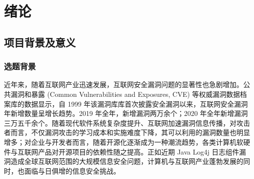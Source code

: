 \documentclass[a4paper,AutoFakeBold,oneside,12pt]{book}
\begin{document}
\blankmatter


\blankmatter


\blankmatter


\blankmatter


\frontmatter\tableofcontents %


\newpage\mainmatter
{}

\sloppy

\chapter{绪论}

\section{项目背景及意义}

\subsection{选题背景}

近年来，随着互联网产业迅速发展，互联网安全漏洞问题的显著性也急剧增加。公共漏洞和暴露 (Common Vulnerabilities and Exposures, CVE) 等权威漏洞数据档案库的数据显示\cite{download_cve_list}\cite{nvd_cpe_statistics}，自 1999 年该漏洞库库首次披露安全漏洞以来，互联网安全漏洞年新增数量呈增长趋势。2019 年全年，新增漏洞两万余个；2020 年全年新增漏洞三万五千余个。随着现代软件系统复杂度提升、互联网加速漏洞信息传播，对攻击者而言，不仅漏洞攻击的学习成本和实施难度下降，其可以利用的漏洞数量也明显增多\cite{vuldb_stats}；对企业与开发者而言，随着开源化逐渐成为一种潮流趋势，各类计算机软硬件与互联网产品对开源项目的依赖性随之提高。正如近期 Java Log4j 日志组件漏洞造成全球互联网范围的大规模信息安全问题，计算机与互联网产业蓬勃发展的同时，也面临与日俱增的信息安全挑战。
\end{document}
